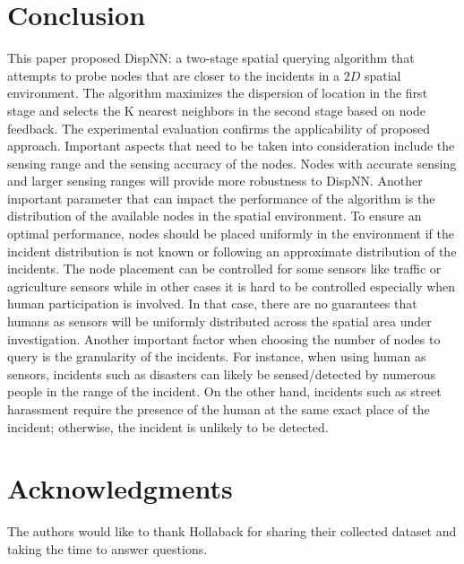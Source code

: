 \documentclass{acm_proc_article-sp}
\begin{document}
\section{Conclusion}
This paper proposed DispNN: a two-stage spatial querying algorithm that attempts to probe nodes that are closer to the incidents in a $2D$ spatial environment. The algorithm maximizes the dispersion of location in the first stage and selects the K nearest neighbors in the second stage based on node feedback. The experimental evaluation confirms the applicability of proposed approach.
Important aspects that need to be taken into consideration include the sensing range and the sensing accuracy of the nodes. Nodes with accurate sensing and larger sensing ranges will provide more robustness to DispNN. Another important parameter that can impact the performance of the algorithm is the distribution of the available nodes in the spatial environment. To ensure an optimal performance, nodes should be placed uniformly in the environment if the incident distribution is not known or following an approximate distribution of the incidents. The node placement can be controlled for some sensors like traffic or agriculture sensors while in other cases it is hard to be controlled especially when human participation is involved. In that case, there are no guarantees that humans as sensors will be uniformly distributed across the spatial area under investigation. Another important factor when choosing the number of nodes to query is the granularity of the incidents. For instance, when using human as sensors, incidents such as disasters can likely be sensed/detected by numerous people in the range of the incident. On the other hand, incidents such as street harassment require the presence of the human at the same exact place of the incident; otherwise, the incident is unlikely to be detected.

\section{Acknowledgments}
The authors would like to thank Hollaback for sharing their collected dataset and taking the time to answer questions.

{\footnotesize
}  %
%
%
\end{document}
